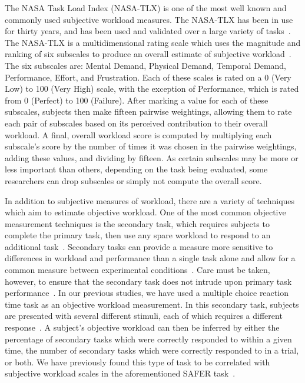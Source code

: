 The NASA Task Load Index (NASA-TLX) is one of the most well known and commonly used subjective workload measures.
The NASA-TLX has been in use for thirty years, and has been used and validated over a large variety of tasks~\citep{hart_nasa-task_2006}.
The NASA-TLX is a multidimensional rating scale which uses the magnitude and ranking of six subscales to produce an overall estimate of subjective workload~\citep{hart_development_1988}.
The six subscales are: Mental Demand, Physical Demand, Temporal Demand, Performance, Effort, and Frustration.
Each of these scales is rated on a 0 (Very Low) to 100 (Very High) scale, with the exception of Performance, which is rated from 0 (Perfect) to 100 (Failure).
After marking a value for each of these subscales, subjects then make fifteen pairwise weightings, allowing them to rate each pair of subscales based on its perceived contribution to their overall workload.
A final, overall workload score is computed by multiplying each subscale's score by the number of times it was chosen in the pairwise weightings, adding these values, and dividing by fifteen.
As certain subscales may be more or less important than others, depending on the task being evaluated, some researchers can drop subscales or simply not compute the overall score.

In addition to subjective measures of workload, there are a variety of techniques which aim to estimate objective workload.
One of the most common objective measurement techniques is the secondary task, which requires subjects to complete the primary task, then use any spare workload to respond to an additional task~\citep{gawron_human_2008}.
Secondary tasks can provide a measure more sensitive to differences in workload and performance than a single task alone and allow for a common measure between experimental conditions~\citep{slocum1971meaningful}.
Care must be taken, however, to ensure that the secondary task does not intrude upon primary task performance~\citep{williges_behavioral_1979}.
In our previous studies, we have used a multiple choice reaction time task as an objective workload measurement.
In this secondary task, subjects are presented with several different stimuli, each of which requires a different response~\citep{lysaght_operator_1989}.
A subject's objective workload can then be inferred by either the percentage of secondary tasks which were correctly responded to within a given time, the number of secondary tasks which were correctly responded to in a trial, or both.
We have previously found this type of task to be correlated with subjective workload scales in the aforementioned SAFER task~\citep{karasinski_real-time_2017}.

